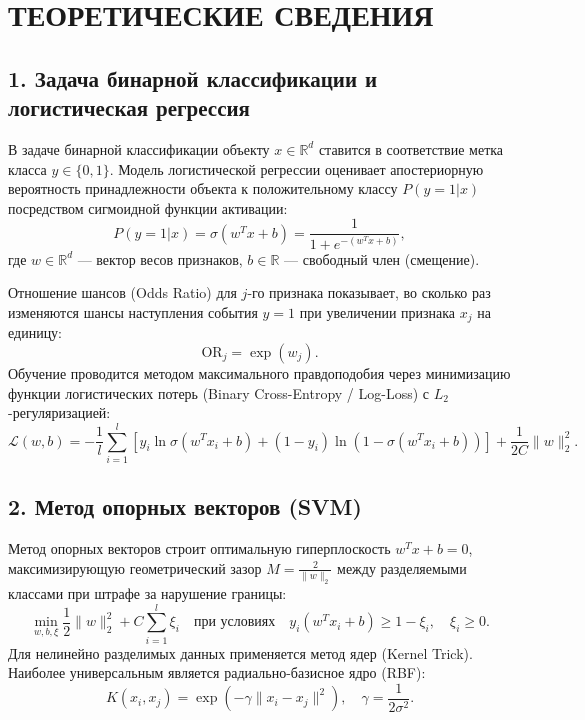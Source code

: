 \documentclass[14pt,a4paper]{extarticle}
\begin{document}
\section*{ТЕОРЕТИЧЕСКИЕ СВЕДЕНИЯ}

\subsection*{1. Задача бинарной классификации и логистическая регрессия}

В задаче бинарной классификации объекту $x \in \mathbb{R}^d$ ставится в соответствие метка класса $y \in \{0, 1\}$. Модель логистической регрессии оценивает апостериорную вероятность принадлежности объекта к положительному классу $P(y=1|x)$ посредством сигмоидной функции активации:
\begin{equation}
  P(y = 1 | x) = \sigma(w^T x + b) = \frac{1}{1 + e^{-(w^T x + b)}},
\end{equation}
где $w \in \mathbb{R}^d$ --- вектор весов признаков, $b \in \mathbb{R}$ --- свободный член (смещение).

Отношение шансов (Odds Ratio) для $j$-го признака показывает, во сколько раз изменяются шансы наступления события $y=1$ при увеличении признака $x_j$ на единицу:
\begin{equation}
  \text{OR}_j = \exp(w_j).
\end{equation}
Обучение проводится методом максимального правдоподобия через минимизацию функции логистических потерь (Binary Cross-Entropy / Log-Loss) с $L_2$-регуляризацией:
\begin{equation}
  \mathcal{L}(w, b) = -\frac{1}{l} \sum_{i=1}^l \left[ y_i \ln \sigma(w^T x_i + b) + (1 - y_i) \ln(1 - \sigma(w^T x_i + b)) \right] + \frac{1}{2C} \|w\|_2^2.
\end{equation}

\subsection*{2. Метод опорных векторов (SVM)}

Метод опорных векторов строит оптимальную гиперплоскость $w^T x + b = 0$, максимизирующую геометрический зазор $M = \frac{2}{\|w\|_2}$ между разделяемыми классами при штрафе за нарушение границы:
\begin{equation}
  \min_{w, b, \xi} \frac{1}{2} \|w\|_2^2 + C \sum_{i=1}^l \xi_i \quad \text{при условиях} \quad y_i(w^T x_i + b) \ge 1 - \xi_i, \quad \xi_i \ge 0.
\end{equation}
Для нелинейно разделимых данных применяется метод ядер (Kernel Trick). Наиболее универсальным является радиально-базисное ядро (RBF):
\begin{equation}
  K(x_i, x_j) = \exp(-\gamma \|x_i - x_j\|^2), \quad \gamma = \frac{1}{2\sigma^2}.
\end{equation}
\end{document}
